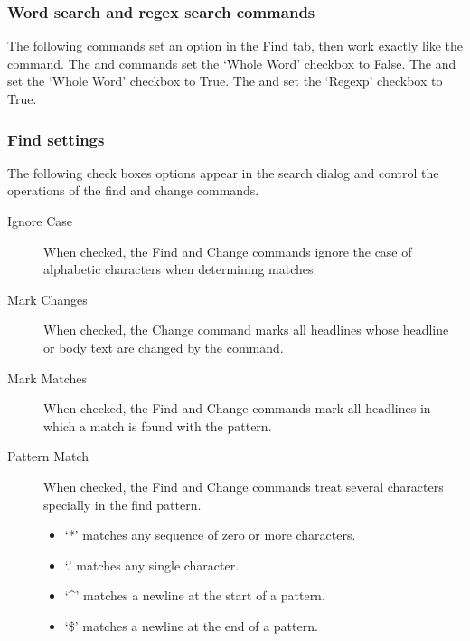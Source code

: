 \documentclass[a4paper,10pt,english]{sphinxmanual}
\begin{document}
\subsubsection{Word search and regex search commands}
\label{commands:word-search-and-regex-search-commands}
The following commands set an option in the Find tab, then work
exactly like the  command. The
 and  commands set the `Whole
Word' checkbox to False. The  and
 set the `Whole Word' checkbox to True. The
 and  set the `Regexp'
checkbox to True.


\subsubsection{Find settings}
\label{commands:find-settings}
The following check boxes options appear in the search dialog and control
the operations of the find and change commands.
\begin{description}
\item[{Ignore Case}] \leavevmode
When checked, the Find and Change commands ignore the case of
alphabetic characters when determining matches.

\item[{Mark Changes}] \leavevmode
When checked, the Change command marks all headlines whose headline or
body text are changed by the command.

\item[{Mark Matches}] \leavevmode
When checked, the Find and Change commands mark all headlines in which
a match is found with the pattern.

\item[{Pattern Match}] \leavevmode
When checked, the Find and Change commands treat several characters
specially in the find pattern.
\begin{itemize}
\item {} 
`*'  matches any sequence of zero or more characters.

\item {} 
`.'  matches any single character.

\item {} 
`\textasciicircum{}'  matches a newline at the start of a pattern.

\item {} 
`\$'  matches a newline at the end of a pattern.

\end{itemize}

\end{description}
\end{document}
